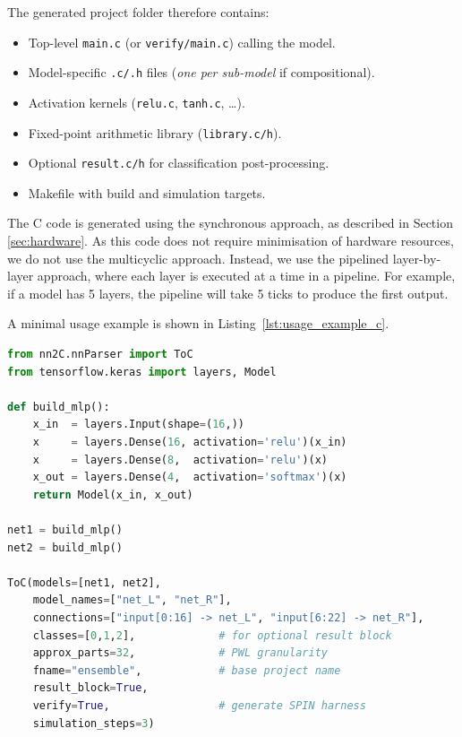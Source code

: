 The generated project folder therefore contains:

\begin{itemize}
  \item Top-level \texttt{main.c} (or \texttt{verify/main.c}) calling the model.
  \item Model-specific \texttt{.c/.h} files (\emph{one per sub-model} if compositional).
  \item Activation kernels (\texttt{relu.c}, \texttt{tanh.c}, \dots).
  \item Fixed-point arithmetic library (\texttt{library.c/h}).
  \item Optional \texttt{result.c/h} for classification post-processing.
  \item Makefile with build and simulation targets.
\end{itemize}

The C code is generated using the synchronous approach, as described in Section \ref{sec:hardware}. As this code does not require minimisation of hardware resources, we do not use the multicyclic approach. Instead, we use the pipelined layer-by-layer approach, where each layer is executed at a time in a pipeline. For example, if a model has 5 layers, the pipeline will take 5 ticks to produce the first output.

A minimal usage example is shown in Listing~\ref{lst:usage_example_c}.

\begin{lstlisting}[language=Python, caption=Python invocation of the nn2C compiler, label=lst:usage_example_c]
from nn2C.nnParser import ToC
from tensorflow.keras import layers, Model

def build_mlp():
    x_in  = layers.Input(shape=(16,))
    x     = layers.Dense(16, activation='relu')(x_in)
    x     = layers.Dense(8,  activation='relu')(x)
    x_out = layers.Dense(4,  activation='softmax')(x)
    return Model(x_in, x_out)

net1 = build_mlp()
net2 = build_mlp()

ToC(models=[net1, net2],
    model_names=["net_L", "net_R"],
    connections=["input[0:16] -> net_L", "input[6:22] -> net_R"],
    classes=[0,1,2],             # for optional result block
    approx_parts=32,             # PWL granularity
    fname="ensemble",            # base project name
    result_block=True,
    verify=True,                 # generate SPIN harness
    simulation_steps=3)
\end{lstlisting}
